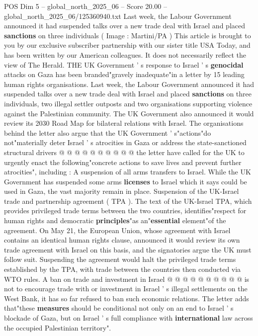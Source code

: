 \begin{textsample}{POS Dim 5 – global\_north\_2025\_06 – Score 20.00 – global\_north\_2025\_06/125360940.txt}  \label{ex:f5_pos_065}
Last week, the Labour Government announced it had suspended talks over a new trade deal with Israel and placed \textbf{sanctions} on three individuals ( Image : Martini/PA ) This article is brought to you by our exclusive subscriber partnership with our sister title USA Today, and has been written by our American colleagues.
It does not necessarily reflect the view of The Herald.
THE UK Government ' s response to Israel ' s \textbf{genocidal} attacks on Gaza has been branded"gravely inadequate"in a letter by 15 leading human rights organisations.
Last week, the Labour Government announced it had suspended talks over a new trade deal with Israel and placed \textbf{sanctions} on three individuals, two illegal settler outposts and two organisations supporting violence against the Palestinian community.
The UK Government also announced it would review its 2030 Road Map for bilateral relations with Israel.
The organisations behind the letter also argue that the UK Government ' s"actions"do not"materially deter Israel ' s atrocities in Gaza or address the state-sanctioned structural drivers @ @ @ @ @ @ @ @ @ @ the letter have called for the UK to urgently enact the following"concrete actions to save lives and prevent further atrocities", including : A suspension of all arms transfers to Israel.
While the UK Government has suspended some arms \textbf{licenses} to Israel which it says could be used in Gaza, the vast majority remain in place.
Suspension of the UK-Israel trade and partnership agreement ( TPA ).
The text of the UK-Israel TPA, which provides privileged trade terms between the two countries, identifies"respect for human rights and democratic \textbf{principles}"as an"\textbf{essential} element"of the agreement.
On May 21, the European Union, whose agreement with Israel contains an identical human rights clause, announced it would review its own trade agreement with Israel on this basis, and the signatories argue the UK must follow suit.
Suspending the agreement would halt the privileged trade terms established by the TPA, with trade between the countries then conducted via WTO rules.
A ban on trade and investment in Israel @ @ @ @ @ @ @ @ @ @ is not to encourage trade with or investment in Israel ' s illegal settlements on the West Bank, it has so far refused to ban such economic relations.
The letter adds that"these \textbf{measures} should be conditional not only on an end to Israel ' s blockade of Gaza, but on Israel ' s full compliance with \textbf{international} law across the occupied Palestinian territory".

\end{textsample}

